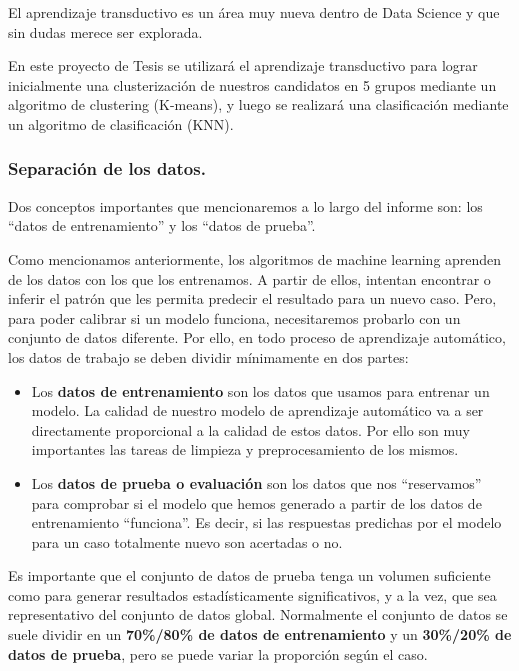 \documentclass[12pt,a4paper]{article}
\begin{document}
\begin{sloppypar}
El aprendizaje transductivo es un área muy nueva dentro de Data Science y que sin dudas merece ser explorada.

En este proyecto de Tesis se utilizará el aprendizaje transductivo para lograr inicialmente una clusterización de nuestros candidatos en 5 grupos mediante un algoritmo de clustering (K-means), y luego se realizará una clasificación mediante un algoritmo de clasificación (KNN). 

\subsubsection{Separación de los datos.}\label{Separacion datos}

Dos conceptos importantes que mencionaremos a lo largo del informe son: los “datos de entrenamiento” y los “datos de prueba”.

Como mencionamos anteriormente, los algoritmos de machine learning aprenden de los datos con los que los entrenamos. A partir de ellos, intentan encontrar o inferir el patrón que les permita predecir el resultado para un nuevo caso. Pero, para poder calibrar si un modelo funciona, necesitaremos probarlo con un conjunto de datos diferente. Por ello, en todo proceso de aprendizaje automático, los datos de trabajo se deben dividir mínimamente en dos partes:

\begin{itemize}
\item Los \textbf{datos de entrenamiento} son los datos que usamos para entrenar un modelo. La calidad de nuestro modelo de aprendizaje automático va a ser directamente proporcional a la calidad de estos datos. Por ello son muy importantes las tareas de limpieza y preprocesamiento de los mismos.
\item Los \textbf{datos de prueba o evaluación} son los datos que nos “reservamos” para comprobar si el modelo que hemos generado a partir de los datos de entrenamiento “funciona”.  Es decir, si las respuestas predichas por el modelo para un caso totalmente nuevo son acertadas o no.
\end{itemize}


Es importante que el conjunto de datos de prueba tenga un volumen suficiente como para generar resultados estadísticamente significativos, y a la vez, que sea representativo del conjunto de datos global. Normalmente el conjunto de datos se suele dividir en un \textbf{70\%/80\% de datos de entrenamiento} y un \textbf{30\%/20\% de datos de prueba}, pero se puede variar la proporción según el caso\cite{apunte_uba}. 



\end{sloppypar}
\end{document}

